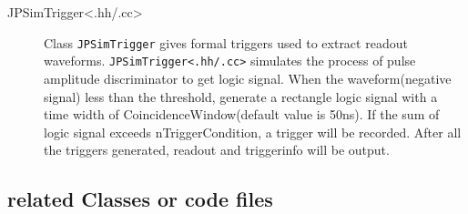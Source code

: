 \begin{description}
    \item[JPSimTrigger<.hh/.cc>] Class \texttt{JPSimTrigger} gives formal triggers used to extract readout waveforms.
    \texttt{JPSimTrigger<.hh/.cc>} simulates the process of pulse amplitude discriminator to get logic signal. 
    When the waveform(negative signal) less than the threshold, generate a rectangle logic signal with
    a time width of CoincidenceWindow(default value is 50ns). If the sum of logic signal exceeds nTriggerCondition, a trigger will be
    recorded. After all the triggers generated, readout and triggerinfo will be output.
\end{description}

\subsection{related Classes or code files}
